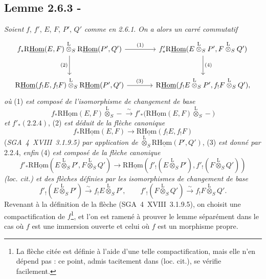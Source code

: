 \subsection*{Lemme 2.6.3 -}
\emph{Soient} $f$, $f'$, $E$, $F$, $P'$, $Q'$ \emph{comme en 2.6.1}. \emph{On a alors un carré commutatif}
\[
\begin{tikzcd}[column sep=large,row sep=large]
f_*\mathrm{R}\underline{\mathrm{Hom}}(E,F)\overset{\mathrm{L}}{\otimes}_S\mathrm{R}\underline{\mathrm{Hom}}(P',Q') \arrow[r,"(1)"] \arrow[d,"(2)"'] & f'_*\mathrm{R}\underline{\mathrm{Hom}}(E\overset{\mathrm{L}}{\otimes}_SP',F\overset{\mathrm{L}}{\otimes}_SQ') \arrow[d,"(4)"]\\
\mathrm{R}\underline{\mathrm{Hom}}(f_!E,f_!F)\overset{\mathrm{L}}{\otimes}_S\mathrm{R}\underline{\mathrm{Hom}}(P',Q') \arrow[r,"(3)"] & \mathrm{R}\underline{\mathrm{Hom}}(f_!E\overset{\mathrm{L}}{\otimes}_SP',f_!F\overset{\mathrm{L}}{\otimes}_SQ'),
\end{tikzcd}
\]
\emph{où} (1) \emph{est composé de l'isomorphisme de changement de base}
\[
f_*\mathrm{R}\underline{\mathrm{Hom}}(E,F)\overset{\mathrm{L}}{\otimes}_S -\xrightarrow{\sim}f'_*\bigl(\mathrm{R}\underline{\mathrm{Hom}}(E,F)\overset{\mathrm{L}}{\otimes}_S-\bigr)
\]
\emph{et} $f'_*(2.2.4)$, (2) \emph{est déduit de la flèche canonique}
\[
f_*\mathrm{R}\underline{\mathrm{Hom}}(E,F)\longrightarrow\mathrm{R}\underline{\mathrm{Hom}}(f_!E,f_!F)
\]
(\emph{SGA~4~XVIII~3.1.9.5) par application de} $\overset{\mathrm{L}}{\otimes}_S\mathrm{R}\underline{\mathrm{Hom}}(P',Q')$, (3) \emph{est donné par} 2.2.4, \emph{enfin} (4) \emph{est composé de la flèche canonique}
\[
f'_*\mathrm{R}\underline{\mathrm{Hom}}(E\overset{\mathrm{L}}{\otimes}_SP',F\overset{\mathrm{L}}{\otimes}_SQ')
\longrightarrow
\mathrm{R}\underline{\mathrm{Hom}}(f'_!(E\overset{\mathrm{L}}{\otimes}_SP'),f'_!(F\overset{\mathrm{L}}{\otimes}_SQ'))
\]
\emph{(loc. cit.) et des flèches définies par les isomorphismes de changement de base}
\[
f'_!(E\overset{\mathrm{L}}{\otimes}_SP')\xrightarrow{\sim}f_!E\overset{\mathrm{L}}{\otimes}_SP',
\qquad
f'_!(F\overset{\mathrm{L}}{\otimes}_SQ')\xrightarrow{\sim}f_!F\overset{\mathrm{L}}{\otimes}_SQ'.
\]
Revenant à la définition de la flèche (SGA~4~XVIII~3.1.9.5), on choisit une compactification de $f$\footnote{La flèche citée est définie à l'aide d'une telle compactification, mais elle n'en dépend pas : ce point, admis tacitement dans (loc. cit.), se vérifie facilement.}, et l'on est ramené à prouver le lemme séparément dans le cas où $f$ est une immersion ouverte et celui où $f$ est un morphisme propre.


